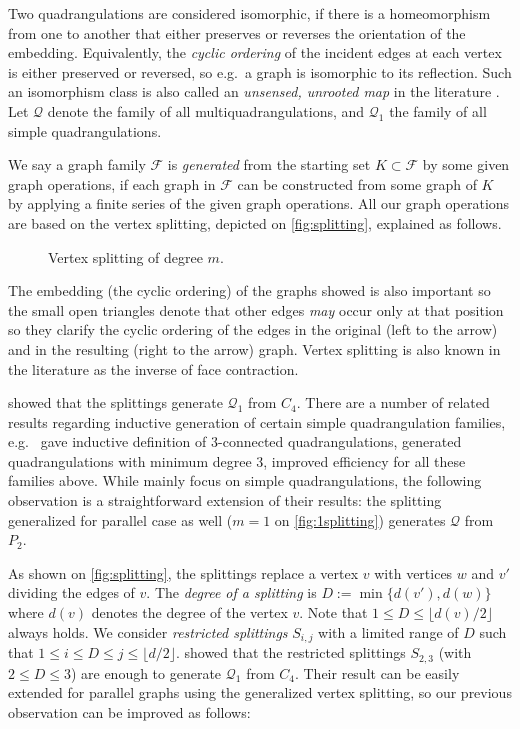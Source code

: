 \documentclass[]{article}
\newcommand{\sdeg}{m}
\begin{document}
Two quadrangulations are considered isomorphic, if there is a homeomorphism from one to another that either preserves or reverses the orientation of the embedding.
Equivalently, the \emph{cyclic ordering} of the incident edges at each vertex is either preserved or reversed, so e.g.\  a graph is isomorphic to its reflection.
Such an isomorphism class is also called an \emph{unsensed, unrooted map} in the literature \cite{Walsh2007}.
Let $\mathscr{Q}$ denote the family of all multiquadrangulations, and $\mathscr{Q}_1$ the family of all simple quadrangulations.

We say a graph family $\mathscr{F}$ is \emph{generated} from the starting set ${K}\subset\mathscr{F}$ by some given graph operations, if each graph in $\mathscr{F}$ can be constructed from some graph of ${K}$ by applying a finite series of the given graph operations.
All our graph operations are based on the vertex splitting, depicted on \autoref{fig:splitting}, explained as follows.
\begin{figure}\centering
  \subfigure[$\sdeg>1$]{
    \label{fig:msplitting}
    \texttt{[image: suh-splitting]}
  }
  \qquad
  \subfigure[$\sdeg=1$]{
    \label{fig:1splitting}
    \texttt{[image: suh-1splitting]}
  }
  \caption{Vertex splitting of degree $m$.}
  \label{fig:splitting}
\end{figure}
The embedding (the cyclic ordering) of the graphs showed is also important so the small open triangles denote that other edges \emph{may} occur only at that position so they clarify the cyclic ordering of the edges in the original (left to the arrow) and in the resulting (right to the arrow) graph.
Vertex splitting is also known in the literature as the inverse of face contraction.

\citet{Batagelj1989, Negami1993} showed that the splittings generate $\mathscr{Q}_1$ from $C_4$.
There are a number of related results regarding inductive generation of certain simple quadrangulation families, e.g.\ 
\citet{Batagelj1989} gave inductive definition of 3-connected quadrangulations,
\citet{Nakamoto1999} generated quadrangulations with minimum degree 3, \citet{Brinkmann2005} improved efficiency for all these families above.
While \cite{Batagelj1989, Negami1993, Nakamoto1996b} mainly focus on simple quadrangulations, the following observation is a straightforward extension of their results: the splitting generalized for parallel case as well ($\sdeg=1$ on \autoref{fig:1splitting}) generates $\mathscr{Q}$ from $P_2$.

As shown on \autoref{fig:splitting}, the splittings replace a vertex $v$ with vertices $w$ and $v'$ dividing the edges of $v$.
The \emph{degree of a splitting} is $D:=\min\{d(v'),d(w)\}$ where $d(v)$ denotes the degree of the vertex $v$.
Note that $1\leq D\leq \lfloor d(v)/2 \rfloor$ always holds.
We consider \emph{restricted splittings} $S_{i,j}$ with a limited range of $D$ such that $1\leq i\leq D \leq j\leq \lfloor d/2\rfloor$.
\citet{Brinkmann2005} showed that the restricted splittings $S_{2,3}$ (with $2\leq D\leq 3$) are enough to generate $\mathscr{Q}_1$ from $C_4$.
Their result can be easily extended for parallel graphs using the generalized vertex splitting, so our previous observation can be improved as follows:
\end{document}

